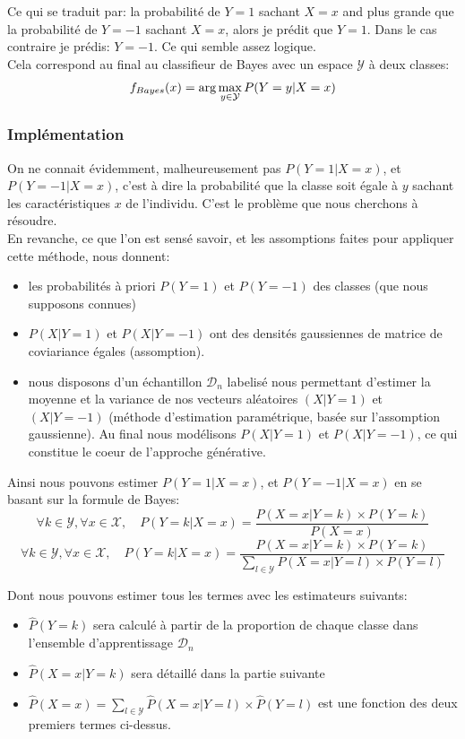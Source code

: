 \documentclass[a4paper]{article}
\theoremstyle{plain}
\begin{document}
Ce qui se traduit par: la probabilité de $Y=1$ sachant $X=x$ and plus grande que la probabilité de $Y=-1$ sachant $X=x$, alors je prédit que $Y=1$. Dans le cas contraire je prédis: $Y=-1$. Ce qui semble assez logique.\\

Cela correspond au final au classifieur de Bayes avec un espace $\mathcal{Y}$ à deux classes:
$$f_{Bayes}(x) = {\rm arg} \displaystyle\max_{y \in \mathcal{Y}} P(Y=y|X=x)$$


\subsubsection{Implémentation}

On ne connait évidemment, malheureusement pas $P(Y=1|X=x)$, et $P(Y=-1|X=x)$, c'est à dire la probabilité que la classe soit égale à $y$ sachant les caractéristiques $x$ de l'individu. C'est le problème que nous cherchons à résoudre.\\


En revanche, ce que l'on est sensé savoir, et les assomptions faites pour appliquer cette méthode, nous donnent: 
\begin{itemize}
\item les probabilités à priori $P(Y=1)$ et $P(Y=-1)$ des classes (que nous supposons connues)
\item $P(X|Y=1)$ et $P(X|Y=-1)$ ont des densités gaussiennes de matrice de coviariance égales (assomption).
\item nous disposons d'un échantillon $\mathcal{D}_n$ labelisé nous permettant d'estimer la moyenne et la variance de nos vecteurs aléatoires $(X|Y=1)$ et $(X|Y=-1)$ (méthode d'estimation paramétrique, basée sur l'assomption gaussienne). Au final nous modélisons $P(X|Y=1)$ et $P(X|Y=-1)$, ce qui constitue le coeur de l'approche générative.
\end{itemize}

Ainsi nous pouvons estimer $P(Y=1|X=x)$, et $P(Y=-1|X=x)$ en se basant sur la formule de Bayes:
$$\forall k \in \mathcal{Y}, \forall x \in \mathcal{X}, \quad P(Y=k|X=x) = \frac{ P(X=x|Y=k) \times P(Y=k)}{P(X=x)} $$
$$\forall k \in \mathcal{Y}, \forall x \in \mathcal{X}, \quad P(Y=k|X=x) = \frac{ P(X=x|Y=k) \times P(Y=k)}{\sum_{l \in \mathcal{Y}} P(X=x|Y=l)\times P(Y=l)} $$

Dont nous pouvons estimer tous les termes avec les estimateurs suivants:\\
\begin{itemize}
\item $\hat P(Y=k)$ sera calculé à partir de la proportion de chaque classe dans l'ensemble d'apprentissage $\mathcal{D}_n$
\item $\hat P(X=x|Y=k)$ sera détaillé dans la partie suivante
\item $\hat P(X=x) = \sum_{l \in \mathcal{Y}} \hat P(X=x|Y=l)\times \hat P(Y=l)$ est une fonction des deux premiers termes ci-dessus.
\end{itemize}
\end{document}
